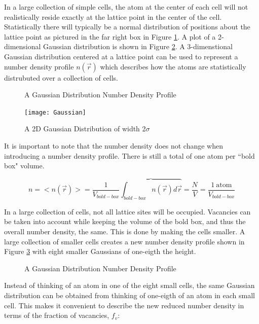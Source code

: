 \documentclass[double,12pt]{beavtex}
\begin{document}
In a large collection of simple cells, the atom at the center of each cell will not realistically reside exactly at the lattice point in the center of the cell. Statistically there will typically be a normal distribution of positions about the lattice point as pictured in the far right box in Figure \ref{fig:Ensemble_Gaus}. A plot of a 2-dimensional Gaussian distribution is shown in Figure \ref{fig:Gaus_plot}. A 3-dimenstional Gaussian distribution centered at a lattice point can be used to represent a number density profile $n(\vec{r})$  which describes how the atoms are statistically distrubuted over a collection of cells.

  \begin{figure}[h!]
    \centering
    \caption{A Gaussian Distribution Number Density Profile}
    \label{fig:Ensemble_Gaus}
  \end{figure} 


 \begin{figure}[h!]
    \centering
    \texttt{[image: Gaussian]}
    \caption{A 2D Gaussian Distribution of width 2$\sigma$}
    \label{fig:Gaus_plot}
  \end{figure}  

It is important to note that the number density does not change when introducing a number density profile. There is still a total of one atom per ``bold box" volume.

\begin{equation}{n=<n(\vec{r})>=\frac{1}{V_{bold-box}}\overbrace{\int_{bold-box}{n(\vec{r})}{d\vec{r}}}=\frac{N}{V}=\frac{1~\text{atom}}{V_{bold-box}}}\end{equation}

In a large collection of cells, not all lattice sites will be occupied. Vacancies can be taken into account while keeping the volume of the bold box, and thus the overall number density, the same. This is done by making the cells smaller. A large collection of smaller cells creates a new number density profile shown in Figure \ref{fig:Ensemble_Smallcells} with eight smaller Gaussians of one-eigth the height.

 \begin{figure}[h!]
    \centering
    \caption{A Gaussian Distribution Number Density Profile}
    \label{fig:Ensemble_Smallcells}
  \end{figure} 

Instead of thinking of an atom in one of the eight small cells, the same Gaussian distribution can be obtained from thinking of one-eigth of an atom in each small cell. This makes it convenient to describe the new reduced number density in terms of the fraction of vacancies, $f_v$: 
\end{document}
